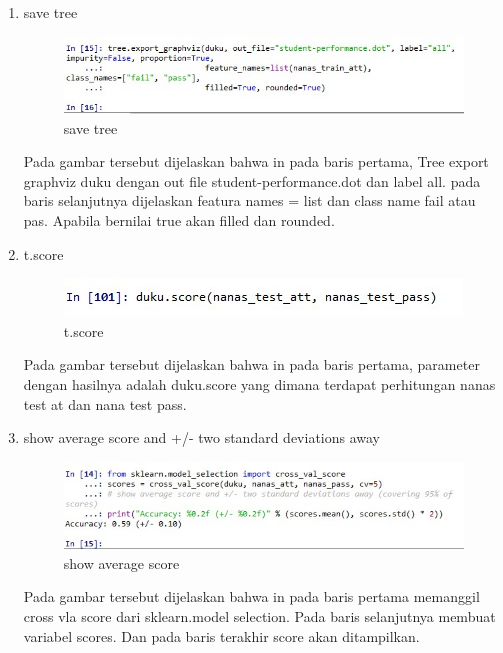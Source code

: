 \begin{enumerate}
\item save tree
\begin{figure}
\centering
\includegraphics[scale=0.5]{figures/g7.jpg}
\caption{save tree}
\label{contoh}
\end{figure}
\par Pada gambar tersebut dijelaskan bahwa in pada baris pertama, Tree export graphviz duku dengan out file student-performance.dot dan label all. pada baris selanjutnya dijelaskan featura names = list dan class name fail atau pas. Apabila bernilai true akan filled dan rounded.
 
\item t.score
\begin{figure}
\centering
\includegraphics[scale=0.5]{figures/g8.jpg}
\caption{t.score}
\label{contoh}
\end{figure}
\par Pada gambar tersebut dijelaskan bahwa in pada baris pertama, parameter dengan hasilnya adalah duku.score yang dimana terdapat perhitungan nanas test at dan nana test pass.


\item show average score and +/- two standard deviations away 
\begin{figure}
\centering
\includegraphics[scale=0.5]{figures/g9.jpg}
\caption{show average score}
\label{contoh}
\end{figure}
\par Pada gambar tersebut dijelaskan bahwa in pada baris pertama memanggil cross vla score dari sklearn.model selection. Pada baris selanjutnya membuat variabel scores. Dan pada baris terakhir score akan ditampilkan.


\end{enumerate}
